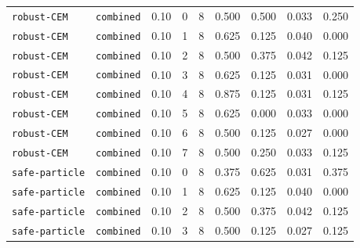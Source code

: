 \documentclass{article}
\begin{document}
\begin{center}
\begin{tabular}{llccccccc}
\texttt{robust-CEM} & \texttt{combined} & 0.10 & 0 & 8 & 0.500 & 0.500 & 0.033 & 0.250 \\
\texttt{robust-CEM} & \texttt{combined} & 0.10 & 1 & 8 & 0.625 & 0.125 & 0.040 & 0.000 \\
\texttt{robust-CEM} & \texttt{combined} & 0.10 & 2 & 8 & 0.500 & 0.375 & 0.042 & 0.125 \\
\texttt{robust-CEM} & \texttt{combined} & 0.10 & 3 & 8 & 0.625 & 0.125 & 0.031 & 0.000 \\
\texttt{robust-CEM} & \texttt{combined} & 0.10 & 4 & 8 & 0.875 & 0.125 & 0.031 & 0.125 \\
\texttt{robust-CEM} & \texttt{combined} & 0.10 & 5 & 8 & 0.625 & 0.000 & 0.033 & 0.000 \\
\texttt{robust-CEM} & \texttt{combined} & 0.10 & 6 & 8 & 0.500 & 0.125 & 0.027 & 0.000 \\
\texttt{robust-CEM} & \texttt{combined} & 0.10 & 7 & 8 & 0.500 & 0.250 & 0.033 & 0.125 \\
\texttt{safe-particle} & \texttt{combined} & 0.10 & 0 & 8 & 0.375 & 0.625 & 0.031 & 0.375 \\
\texttt{safe-particle} & \texttt{combined} & 0.10 & 1 & 8 & 0.625 & 0.125 & 0.040 & 0.000 \\
\texttt{safe-particle} & \texttt{combined} & 0.10 & 2 & 8 & 0.500 & 0.375 & 0.042 & 0.125 \\
\texttt{safe-particle} & \texttt{combined} & 0.10 & 3 & 8 & 0.500 & 0.125 & 0.027 & 0.125 \\
\bottomrule
\end{tabular}
\end{center}
\end{document}
